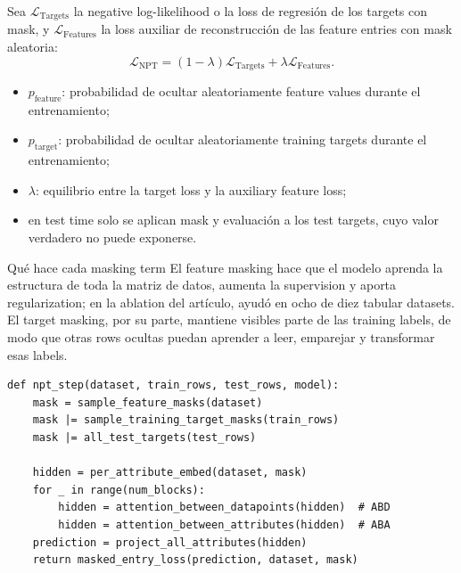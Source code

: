 \documentclass[a4paper]{article}
\begin{document}
Sea $\mathcal{L}_{\mathrm{Targets}}$ la negative log-likelihood o la loss de regresión de los targets con mask, y $\mathcal{L}_{\mathrm{Features}}$ la loss auxiliar de reconstrucción de las feature entries con mask aleatoria:
\[
\mathcal{L}_{\mathrm{NPT}}
=(1-\lambda)\mathcal{L}_{\mathrm{Targets}}
+\lambda\mathcal{L}_{\mathrm{Features}}.
\]

\begin{itemize}
  \item $p_{\mathrm{feature}}$: probabilidad de ocultar aleatoriamente feature values durante el entrenamiento;
  \item $p_{\mathrm{target}}$: probabilidad de ocultar aleatoriamente training targets durante el entrenamiento;
  \item $\lambda$: equilibrio entre la target loss y la auxiliary feature loss;
  \item en test time solo se aplican mask y evaluación a los test targets, cuyo valor verdadero no puede exponerse.
\end{itemize}

\begin{knowledgebox}{Qué hace cada masking term}
El feature masking hace que el modelo aprenda la estructura de toda la matriz de datos, aumenta la supervision y aporta regularization; en la ablation del artículo, ayudó en ocho de diez tabular datasets. El target masking, por su parte, mantiene visibles parte de las training labels, de modo que otras rows ocultas puedan aprender a leer, emparejar y transformar esas labels.
\end{knowledgebox}


\begin{lstlisting}[caption={Pseudocódigo conceptual del forward de NPT y de la mask aleatoria.}]
def npt_step(dataset, train_rows, test_rows, model):
    mask = sample_feature_masks(dataset)
    mask |= sample_training_target_masks(train_rows)
    mask |= all_test_targets(test_rows)

    hidden = per_attribute_embed(dataset, mask)
    for _ in range(num_blocks):
        hidden = attention_between_datapoints(hidden)  # ABD
        hidden = attention_between_attributes(hidden)  # ABA
    prediction = project_all_attributes(hidden)
    return masked_entry_loss(prediction, dataset, mask)
\end{lstlisting}
\end{document}
